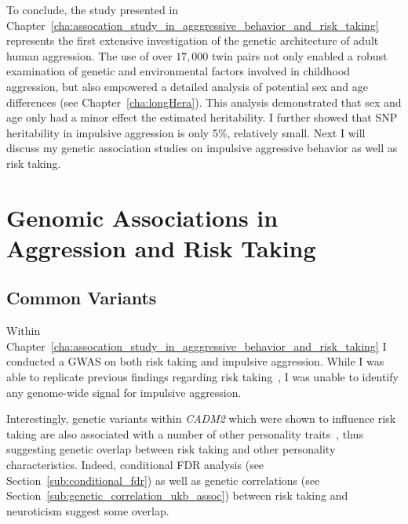 To conclude, the study presented in Chapter~\ref{cha:assocation_study_in_agggressive_behavior_and_risk_taking} represents the first extensive investigation of the genetic architecture of adult human aggression.
The use of over $17,000$ twin pairs not only enabled a robust examination of genetic and environmental factors involved in childhood aggression, but also empowered a detailed analysis of potential sex and age differences (see Chapter~\ref{cha:longHera}).
This analysis demonstrated that sex and age only had a minor effect the estimated heritability.
I further showed that SNP heritability in impulsive aggression is  only 5\%, relatively small.
Next I will discuss my genetic association studies on impulsive aggressive behavior as well as risk taking. 

\section{Genomic Associations in Aggression and Risk Taking}
\label{sec:genomic_associations_in_aggression_and_risk_taking}

\subsection{Common Variants}
\label{sub:common_variants_discussion}

Within Chapter~\ref{cha:assocation_study_in_agggressive_behavior_and_risk_taking} I conducted a GWAS on both risk taking and impulsive aggression.
While I was able to replicate previous findings regarding risk taking~\cite{Day2016}, I was unable to identify any genome-wide signal for impulsive aggression.

Interestingly, genetic variants within \textit{CADM2} which were shown to influence risk taking are also associated with a number of other personality traits~\cite{Boutwell2017},
thus suggesting genetic overlap between risk taking and other personality characteristics.
Indeed, conditional FDR analysis (see Section~\ref{sub:conditional_fdr}) as well as genetic correlations (see Section~\ref{sub:genetic_correlation_ukb_assoc}) between risk taking and neuroticism suggest some overlap.

